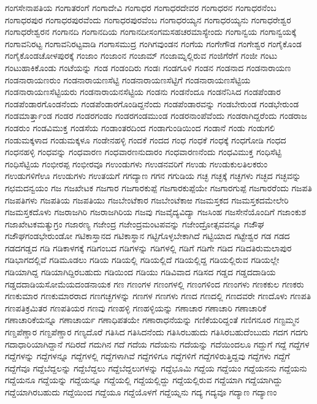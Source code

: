 {ಗಂಗಸೇನಾಪತಿಯ
ಗಂಗಾತರಂಗೆ
ಗಂಗಾದೇವಿ
ಗಂಗಾಧರ
ಗಂಗಾಧರದೇವರ
ಗಂಗಾಧರನ
ಗಂಗಾಧರನೆಂಬ
ಗಂಗಾಧರಪುರ
ಗಂಗಾಧರಪುರವೆಂದು
ಗಂಗಾಧರಪುರವೆಂಬ
ಗಂಗಾಧರಯ್ಯನ
ಗಂಗಾಧರಯ್ಯನು
ಗಂಗಾಧರೇಶ್ವರ
ಗಂಗಾಧರೇಶ್ವರನ
ಗಂಗಾನದಿ
ಗಂಗಾನದಿಯ
ಗಂಗಾನದೀಸಂಗಮಸಹಚರಮಾಸ್ಯೇಂದು
ಗಂಗಾನ್ವಯ
ಗಂಗಾನ್ವಯಕ್ಕೆ
ಗಂಗಾವನಿರಟ್ಟ
ಗಂಗಾವನಿರಟ್ಟವಾಡಿ
ಗಂಗಾಸಮುದ್ರ
ಗಂಗಿಗವುಂಡನ
ಗಂಗೆಯ
ಗಂಗೇಗೌಡ
ಗಂಗೇಶ್ವರ
ಗಂಗೈಕೊಂಡ
ಗಂಗೈಕೊಂಡಚೋಳಪುರಕ್ಕೆ
ಗಂಜಾಂ
ಗಂಜಾಂನ
ಗಂಜಾಮ್
ಗಂಜಾಮ್ನಲ್ಲಿರುವ
ಗಂಜಿಗೆರೆಗೆ
ಗಂಜೀ
ಗಂಟು
ಗಂಟುಹಾಕಿಕೊಂಡು
ಗಂಟೆಯನ್ನು
ಗಂಡ
ಗಂಡಂದಿರು
ಗಂಡಃ
ಗಂಡಗೂಳಿ
ಗಂಡನ
ಗಂಡನಾದ
ಗಂಡನಾರಾಯಣ
ಗಂಡನಾರಾಯಣರುಂ
ಗಂಡನಾರಾಯಣಸೆಟ್ಟಿ
ಗಂಡನಾರಾಯಣಸೆಟ್ಟಿಗೆ
ಗಂಡನಾರಾಯಣಸೆಟ್ಟಿಯ
ಗಂಡನಾರಾಯಣಸೆಟ್ಟಿಯರು
ಗಂಡನಾರಾಯನಸೆಟ್ಟಿಯ
ಗಂಡನು
ಗಂಡನೆಂದೂ
ಗಂಡನೆನಿಸಿದ
ಗಂಡಪೆಂಡಾರ
ಗಂಡಪೆಂಡಾರಗೊಂಡನೆಂದು
ಗಂಡಪೆಂಡಾರಗೊಂಡಿದ್ದನೆಂದು
ಗಂಡಪೆಂಡಾರವನ್ನು
ಗಂಡಬೇರುಂಡ
ಗಂಡಭೇರುಂಡ
ಗಂಡಮಾರ್ತ್ತಾಂಡ
ಗಂಡರ
ಗಂಡರಗಂಡಂ
ಗಂಡರಗಂಡಮುಂಡ
ಗಂಡರನಾಂಪೆವೆಂದು
ಗಂಡರಾಗಿದ್ದರೆಂದು
ಗಂಡರಾಜ
ಗಂಡರುಂ
ಗಂಡವಿಮುಕ್ತ
ಗಂಡಸೆಯ
ಗಂಡಾಂತರದಿಂದ
ಗಂಡಾಗುಂಡಿಯಿಂದ
ಗಂಡಾನೆ
ಗಂಡು
ಗಂಡುಗಲಿ
ಗಂಡುಮಕ್ಕಳಾದ
ಗಂಡುಮಕ್ಕಳೂ
ಗಂಡೇನಹಳ್ಳಿ
ಗಂದಕೆ
ಗಂದದ
ಗಂಧ
ಗಂಧಕೆ
ಗಂಧಕ್ಕೆ
ಗಂಧಗೋಡಿ
ಗಂಧದ
ಗಂಧನಹಳ್ಳಿ
ಗಂಧವನ್ನು
ಗಂಧವಾರಣ
ಗಂಧವಾರಣನುದಾರಂ
ಗಂಧವಾರಣನೆಂದು
ಗಂಧವಿಮುಕ್ತ
ಗಂಧಿಸೆಟ್ಟಿ
ಗಂಧಿಸೆಟ್ಟಿಯ
ಗಂಭೀರಪ್ಪ
ಗಂಭೀರವೂ
ಗಉಂಡುಗಳು
ಗಉಡನವರಿಗೆ
ಗಉಡು
ಗಉಡುಕುಲತಿಲಕರುಂ
ಗಉಡುಗಳಿಗೆಊ
ಗಉಡುಗಳು
ಗಉತಯಗೆ
ಗಗದ್ಯಾಣ
ಗಗನ
ಗಗುಡಿಯ
ಗಚ್ಛ
ಗಚ್ಛಕ್ಕೆ
ಗಚ್ಛಗಳು
ಗಚ್ಛದ
ಗಚ್ಛವನ್ನು
ಗಛಮದನ್ವಯಂ
ಗಜ
ಗಜಖೇಟಕ
ಗಜಗಾರ
ಗಜಗಾರಕುಪ್ಪೆ
ಗಜಗಾರಕುಪ್ಪೆಯೇ
ಗಜಗಾರಗುಪ್ಪೆ
ಗಜಗಾರರೆಂದು
ಗಜಪತಿ
ಗಜಪತಿಗಳು
ಗಜಪತಿಯ
ಗಜಪತಿಯು
ಗಜಬೇಂಟೆಕಾರ
ಗಜಬೇಂಟೆಕಾಱ
ಗಜಮಸ್ತಕದ
ಗಜಮಸ್ತಕದಮೇಲೇರಿ
ಗಜಮಸ್ತಕದೊಳು
ಗಜರಾಜಗಿರಿ
ಗಜರಾಜಗಿರಿಯ
ಗಜವು
ಗಜವೈದ್ಯವಿದ್ಯಾ
ಗಜಸಿಂಹ
ಗಜಸೇನೆಯೊಂದಿಗೆ
ಗಜಾಂಕುಶ
ಗಜಾಖೇಟಕಮತ್ಯುಗ್ರಂ
ಗಜಾರಣ್ಯ
ಗಜೇಂದ್ರ
ಗಜೇಂದ್ರಮಂಟಪವನ್ನು
ಗಜೇಂದ್ರೋತ್ಸವವನ್ನೂ
ಗಜೌಘ
ಗಜೌಘಗಂಡಭೇರುಂಡೋ
ಗಟಿಕಾಸ್ತಾನದ
ಗಟಿಕಾಸ್ಥಾನ
ಗಟ್ಟಿಗೊಳ್ಳಬೇಕಾಗಿದೆ
ಗಟ್ಟಿಯಾದ
ಗಟ್ಟೇಶ್ವರ
ಗಡ
ಗಡದ
ಗಡದಗಡ್ಡದ
ಗಡಿ
ಗಡಿಕಾಳಗಕ್ಕೆ
ಗಡಿಗಂಬದ
ಗಡಿಗಳನ್ನು
ಗಡಿಗಳಲ್ಲಿ
ಗಡಿಗೆ
ಗಡಿಗೇ
ಗಡಿದ
ಗಡಿದತಿರುಮಲಾಪುರ
ಗಡಿಭಾಗದಲ್ಲಿವೆ
ಗಡಿಮೂಡಲು
ಗಡಿಯ
ಗಡಿಯಲ್ಲಿ
ಗಡಿಯಲ್ಲಿದೆ
ಗಡಿಯಲ್ಲಿದ್ದ
ಗಡಿಯಲ್ಲಿರುವ
ಗಡಿಯಲ್ಲೇ
ಗಡಿಯಾಗಿದ್ದ
ಗಡಿಯಾಗಿದ್ದಿರಬಹುದು
ಗಡಿಯಿಂದ
ಗಡಿಯು
ಗಡಿವಿವಾದ
ಗಡಿಸದ
ಗಡ್ಡದ
ಗಡ್ಡದದಾಡಿಯ
ಗಡ್ಡದದಾಡಿಯಸೋಮೆಯದಂಡನಾಯಕ
ಗಣ
ಗಣಂಗಳ
ಗಣಂಗಳಲ್ಲಿ
ಗಣಂಗಳಿಂದ
ಗಣಂಗಳು
ಗಣಕಕುಲ
ಗಣಕರು
ಗಣಕುಮಾರ
ಗಣಕುಮಾರರಾದ
ಗಣಗಚ್ಛಗಳನ್ನು
ಗಣಗಳ
ಗಣಗಳು
ಗಣದ
ಗಣದಲ್ಲಿ
ಗಣದವರೇ
ಗಣದೊಳು
ಗಣಪತಿ
ಗಣಪತಿಕ್ರಮಿತರ
ಗಣಪತಿಯರ
ಗಣವು
ಗಣಹಳ್ಳಿ
ಗಣಹಳ್ಳಿಯನ್ನು
ಗಣಾಚಾರ
ಗಣಾಚಾರಿ
ಗಣಾಚಾರಿಕೆ
ಗಣಾಚಾರಿಕೆಯನ್ನೂ
ಗಣಾಚಾರ್ಯ
ಗಣಾಧಿಪತಯೇ
ಗಣಾರಾಧನೆಯನ್ನು
ಗಣಿಕೆಯರಿದ್ದಂತೆ
ಗಣಿಗನೂರ
ಗಣ್ಟಮ್ಮನ
ಗಣ್ಡಪೆಣ್ಡಾರ
ಗಣ್ದಪೆಣ್ಡಾರ
ಗಣ್ಯದೊರೆ
ಗತಿಸಿದ
ಗತಿಸಿದನೆಂದು
ಗತಿಸಿರಬಹುದು
ಗತಿಸಿರಬಹುದೆಂಬುದು
ಗದಗ
ಗದಗು
ಗದಾಧಾರಿಯಾಗಿದ್ದಾನೆ
ಗದಿರದೆ
ಗದುಗಿನ
ಗದೆ
ಗದೆಯ
ಗದೆಯನು
ಗದೆಯನ್ನು
ಗದೆಯಿಂದಲೂ
ಗದ್ದುಗೆ
ಗದ್ದೆ
ಗದ್ದೆಗಳ
ಗದ್ದೆಗಳನ್ನು
ಗದ್ದೆಗಳನ್ನೂ
ಗದ್ದೆಗಳಲ್ಲಿ
ಗದ್ದೆಗಳಾಗಿವೆ
ಗದ್ದೆಗಳಿಗೂ
ಗದ್ದೆಗಳಿಗೆ
ಗದ್ದೆಗಳಿರುತ್ತಿದ್ದವು
ಗದ್ದೆಗಳು
ಗದ್ದೆಗೆ
ಗದ್ದೆಗೆವೂ
ಗದ್ದೆಬೆದ್ದಲನ್ನು
ಗದ್ದೆಬೆದ್ದಲು
ಗದ್ದೆಬೆದ್ದಲುಗಳನ್ನು
ಗದ್ದೆಭೂಮಿ
ಗದ್ದೆಯ
ಗದ್ದೆಯಂ
ಗದ್ದೆಯನನು
ಗದ್ದೆಯನು
ಗದ್ದೆಯನೂ
ಗದ್ದೆಯನ್ನು
ಗದ್ದೆಯನ್ನೂ
ಗದ್ದೆಯಲ್ಲಿ
ಗದ್ದೆಯಲ್ಲಿದ್ದು
ಗದ್ದೆಯಲ್ಲಿರುವ
ಗದ್ದೆಯಾಗಿ
ಗದ್ದೆಯಾಗಿದ್ದು
ಗದ್ದೆಯಾಗಿರಬಹುದು
ಗದ್ದೆಯಿಂದ
ಗದ್ದೆಯೂ
ಗದ್ದೆಯೊಳಗೆ
ಗದ್ದೆಯ್ನನು
ಗದ್ಯ
ಗದ್ಯವೂ
ಗದ್ಯಾಣ
ಗದ್ಯಾಣಂ
}
